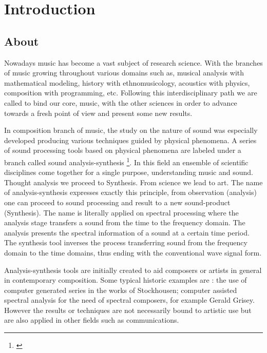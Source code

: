 \chapter{Introduction}
		
\label{ch:Introduction}





\section{About}

Nowadays music has become a vast subject of research science. With the branches of music growing throughout various domains such as, musical analysis with mathematical modeling, history with ethnomusicology, acoustics with physics, composition with programming, etc. Following this interdisciplinary path we are called to bind our core, music, with the other sciences in order to advance towards a fresh point of view and present some new results.

In composition branch of music, the study on the nature of sound was especially developed producing various techniques guided by physical phenomena. A series of sound processing tools based on physical phenomena are labeled under a branch called sound analysis-synthesis \footnote{\citealp{freitascaetano:hal-00604390}}. In this field an ensemble of scientific disciplines come together for a single purpose, understanding music and sound. Thought analysis we proceed to Synthesis. From science we lead to art. The name of analysis-synthesis expresses exactly this principle, from observation (analysis) one can proceed to sound processing and result to a new sound-product (Synthesis). The name is literally applied on spectral processing where the analysis stage transfers a sound from the time to the frequency domain. The analysis presents the spectral information of a sound at a certain time period. The synthesis tool inverses the process transferring sound from the frequency domain to the time domains, thus ending with the conventional wave signal form.

Analysis-synthesis tools are initially created to aid composers or artists in general in contemporary composition. Some typical historic examples are : the use of computer generated series in the works of Stockhousen; computer assisted spectral analysis for the need of spectral composers, for example Gerald Grisey. However the results or techniques are not necessarily bound to artistic use but are also applied in other fields such as communications.

